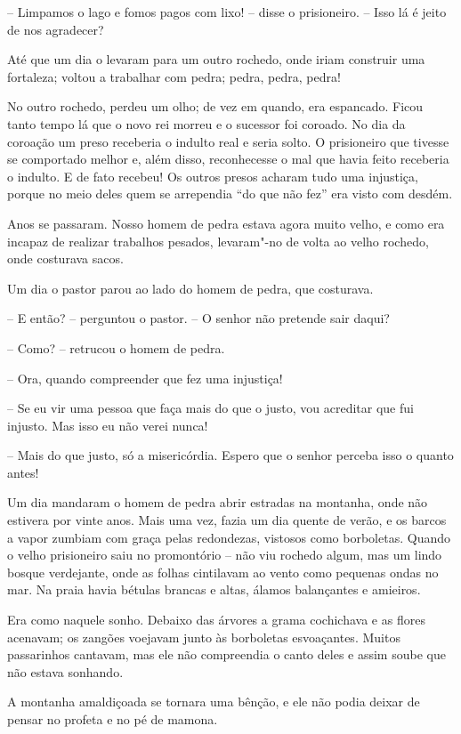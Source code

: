 -- Limpamos o lago e fomos pagos com lixo! -- disse o prisioneiro. -- Isso
lá é jeito de nos agradecer?

Até que um dia o levaram para um outro rochedo, onde iriam construir uma
fortaleza; voltou a trabalhar com pedra; pedra, pedra, pedra!

No outro rochedo, perdeu um olho; de vez em quando, era espancado. Ficou
tanto tempo lá que o novo rei morreu e o sucessor foi coroado. No dia
da coroação um preso receberia o indulto real e seria solto. O
prisioneiro que tivesse se comportado melhor e, além disso,
reconhecesse o mal que havia feito receberia o indulto. E de fato
recebeu! Os outros presos acharam tudo uma injustiça, porque no meio
deles quem se arrependia ``do que não fez'' era visto com desdém.

Anos se passaram. Nosso homem de pedra estava agora muito velho, e como
era incapaz de realizar trabalhos pesados, levaram"-no de volta ao
velho rochedo, onde costurava sacos.

Um dia o pastor parou ao lado do homem de pedra, que costurava.

-- E então? -- perguntou o pastor. -- O senhor não pretende sair daqui?

-- Como? -- retrucou o homem de pedra.

-- Ora, quando compreender que fez uma injustiça!

-- Se eu vir uma pessoa que faça mais do que o justo, vou acreditar que
fui injusto. Mas isso eu não verei nunca!

-- Mais do que justo, só a misericórdia. Espero que o senhor perceba isso
o quanto antes!

Um dia mandaram o homem de pedra abrir estradas na montanha, onde não
estivera por vinte anos. Mais uma vez, fazia um dia quente de verão, e
os barcos a vapor zumbiam com graça pelas redondezas, vistosos como
borboletas. Quando o velho prisioneiro saiu no promontório -- não viu rochedo algum,
mas um lindo bosque verdejante, onde as folhas cintilavam ao vento como
pequenas ondas no mar. Na praia havia bétulas brancas e altas, álamos
balançantes e amieiros.

Era como naquele sonho. Debaixo das árvores a grama cochichava e as		\EP[]
flores acenavam; os zangões voejavam junto às borboletas esvoaçantes.
Muitos passarinhos \mbox{cantavam}, mas ele não compreendia o canto deles e
assim soube que não estava sonhando.

A montanha amaldiçoada se tornara uma bênção, e ele não podia deixar de
pensar no profeta e no pé de mamona.

